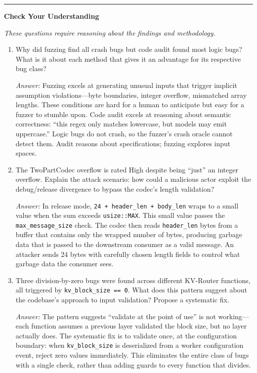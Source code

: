 \medskip
\begin{center}\rule{0.5\linewidth}{0.4pt}\end{center}
\medskip

\noindent\textbf{Check Your Understanding}

\smallskip
\noindent\emph{These questions require reasoning about the findings and methodology.}

\begin{enumerate}
  \item Why did fuzzing find all crash bugs but code audit found most logic bugs? What is it about each method that gives it an advantage for its respective bug class?

  \emph{Answer:} Fuzzing excels at generating unusual inputs that trigger implicit assumption violations---byte boundaries, integer overflow, mismatched array lengths. These conditions are hard for a human to anticipate but easy for a fuzzer to stumble upon. Code audit excels at reasoning about semantic correctness: ``this regex only matches lowercase, but models may emit uppercase.'' Logic bugs do not crash, so the fuzzer's crash oracle cannot detect them. Audit reasons about specifications; fuzzing explores input spaces.

  \item The TwoPartCodec overflow is rated High despite being ``just'' an integer overflow. Explain the attack scenario: how could a malicious actor exploit the debug/release divergence to bypass the codec's length validation?

  \emph{Answer:} In release mode, \texttt{24 + header\_len + body\_len} wraps to a small value when the sum exceeds \texttt{usize::MAX}. This small value passes the \texttt{max\_message\_size} check. The codec then reads \texttt{header\_len} bytes from a buffer that contains only the wrapped number of bytes, producing garbage data that is passed to the downstream consumer as a valid message. An attacker sends 24 bytes with carefully chosen length fields to control what garbage data the consumer sees.

  \item Three division-by-zero bugs were found across different KV-Router functions, all triggered by \texttt{kv\_block\_size == 0}. What does this pattern suggest about the codebase's approach to input validation? Propose a systematic fix.

  \emph{Answer:} The pattern suggests ``validate at the point of use'' is not working---each function assumes a previous layer validated the block size, but no layer actually does. The systematic fix is to validate once, at the configuration boundary: when \texttt{kv\_block\_size} is deserialized from a worker configuration event, reject zero values immediately. This eliminates the entire class of bugs with a single check, rather than adding guards to every function that divides.


\end{enumerate}
